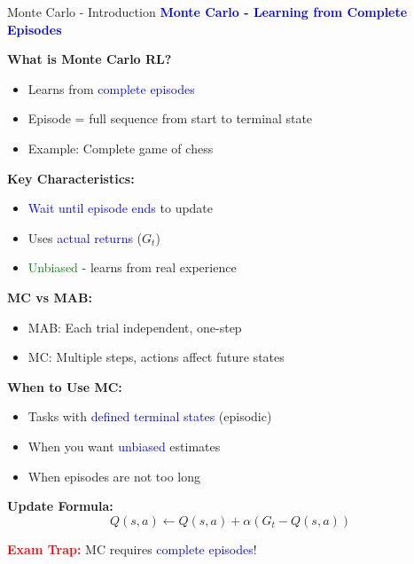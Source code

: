 \documentclass[8pt]{beamer}
\begin{document}
\begin{frame}{Monte Carlo - Introduction}
\fontsize{6.5}{7.5}\selectfont
\textcolor{blue}{\textbf{Monte Carlo - Learning from Complete Episodes}}

\textbf{What is Monte Carlo RL?}
\begin{itemize}
\item Learns from \textcolor{blue}{complete episodes}
\item Episode = full sequence from start to terminal state
\item Example: Complete game of chess
\end{itemize}

\textbf{Key Characteristics:}
\begin{itemize}
\item \textcolor{blue}{Wait until episode ends} to update
\item Uses \textcolor{blue}{actual returns} ($G_t$)
\item \textcolor{green}{Unbiased} - learns from real experience
\end{itemize}

\textbf{MC vs MAB:}
\begin{itemize}
\item MAB: Each trial independent, one-step
\item MC: Multiple steps, actions affect future states
\end{itemize}

\textbf{When to Use MC:}
\begin{itemize}
\item Tasks with \textcolor{blue}{defined terminal states} (episodic)
\item When you want \textcolor{blue}{unbiased} estimates
\item When episodes are not too long
\end{itemize}

\textbf{Update Formula:}
\[
Q(s,a) \leftarrow Q(s,a) + \alpha(G_t - Q(s,a))
\]

\textcolor{red}{\textbf{Exam Trap:}} MC requires \textcolor{blue}{complete episodes}!
\end{frame}
\end{document}
